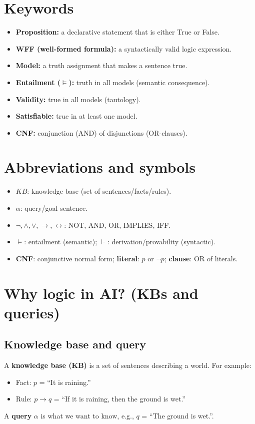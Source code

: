 \documentclass[11pt]{article}
\begin{document}
\section{Keywords}
\begin{itemize}[leftmargin=*]
  \item \textbf{Proposition:} a declarative statement that is either True or False.
  \item \textbf{WFF (well-formed formula):} a syntactically valid logic expression.
  \item \textbf{Model:} a truth assignment that makes a sentence true.
  \item \textbf{Entailment ($\models$):} truth in all models (semantic consequence).
  \item \textbf{Validity:} true in all models (tautology).
  \item \textbf{Satisfiable:} true in at least one model.
  \item \textbf{CNF:} conjunction (AND) of disjunctions (OR-clauses).
\end{itemize}

\section{Abbreviations and symbols}
\begin{itemize}[leftmargin=*]
  \item $KB$: knowledge base (set of sentences/facts/rules).
  \item $\alpha$: query/goal sentence.
  \item $\lnot,\land,\lor,\rightarrow,\leftrightarrow$: NOT, AND, OR, IMPLIES, IFF.
  \item $\models$: entailment (semantic); $\vdash$: derivation/provability (syntactic).
  \item \textbf{CNF}: conjunctive normal form; \textbf{literal}: $p$ or $\lnot p$; \textbf{clause}: OR of literals.
\end{itemize}

\section{Why logic in AI? (KBs and queries)}
\subsection{Knowledge base and query}
A \textbf{knowledge base (KB)} is a set of sentences describing a world.
For example:
\begin{itemize}[leftmargin=*]
  \item Fact: $p$ = ``It is raining.''
  \item Rule: $p \rightarrow q$ = ``If it is raining, then the ground is wet.''
\end{itemize}
A \textbf{query} $\alpha$ is what we want to know, e.g., $q$ = ``The ground is wet.''.
\end{document}
